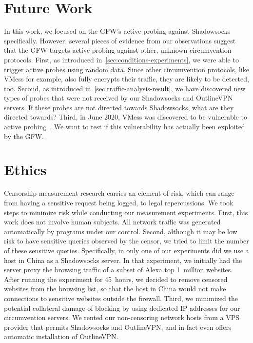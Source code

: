 \documentclass[sigconf,letterpaper]{acmart}
\begin{document}
\section{Future Work}
\label{sec:future-work}

In this work,
we focused on the GFW's active probing against Shadowsocks specifically.
However,
several pieces of evidence from our observations
suggest that the GFW targets active probing against other, unknown circumvention protocols.
First,
as introduced in~\autoref{sec:conditions-experiments},
we were able to trigger active probes using random data.
Since other circumvention protocols,
like VMess for example,
also fully encrypts their traffic,
they are likely to be detected, too.
Second,
as introduced in~\autoref{sec:traffic-analysis-result},
we have discovered new types of probes that were not received by
our Shadowsocks and OutlineVPN servers.
If these probes are not directed towards Shadowsocks,
what are they directed towards?
Third,
in June 2020,
VMess was discovered to be vulnerable to active probing~\cite{v2ray-replay-1, v2ray-replay-2, v2ray-replay-summary}.
We want to test if this vulnerability has actually been exploited by the GFW.

\section{Ethics}
\label{sec:ethics}

Censorship measurement research carries an element of risk,
which can range from having a sensitive request being logged, to legal repercussions.
We took steps to minimize risk while conducting our measurement experiments.
First,
this work does not involve human subjects.
All network traffic was generated automatically by programs under our control.
Second,
although it may be low risk to have sensitive queries observed by the censor,
we tried to limit the number of these sensitive queries.
Specifically,
in only one of our experiments
did we use a host in China as a Shadowsocks server.
In that experiment,
we initially had the server proxy the browsing traffic of a subset of Alexa top 1~million websites.
After running the experiment for 45~hours,
we decided to remove censored websites from the browsing list,
so that the host in China would not make connections
to sensitive websites outside the firewall.
Third,
we minimized the potential collateral damage of blocking
by using dedicated IP addresses for our circumvention servers.
We rented our non-censoring network hosts from a VPS provider that permits Shadowsocks and OutlineVPN,
and in fact even offers automatic installation of OutlineVPN.
\end{document}
